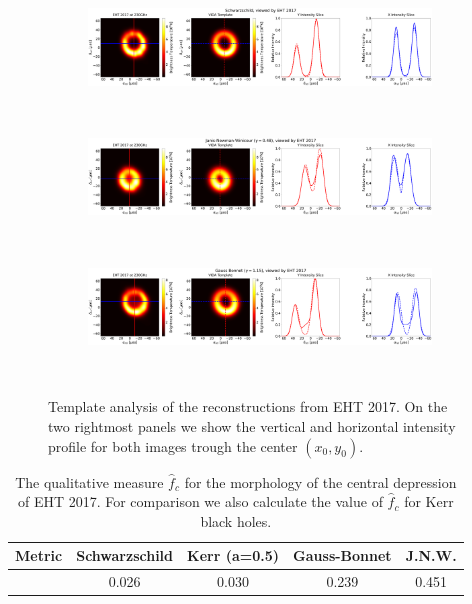 \documentclass[12pt]{article}
\numberwithin{equation}{section}
\numberwithin{figure}{section}
\begin{document}
	\begin{figure}[h!]
		\centering
		\begin{subfigure}{12cm}
			\hspace{-1.5cm}
			\includegraphics[scale = 0.13]{Section_8_Observing_Horizonless_Objects/Ehtim_Vida_plot_2017_230_Sch.png}
		\end{subfigure}\\
		\begin{subfigure}{12cm}
			\hspace{-1.5cm}
			\includegraphics[scale = 0.13]{Section_8_Observing_Horizonless_Objects/Ehtim_Vida_plot_2017_230_JNW.png}
		\end{subfigure}\\
		\begin{subfigure}{12cm}
			\hspace{-1.5cm}
			\includegraphics[scale = 0.13]{Section_8_Observing_Horizonless_Objects/Ehtim_Vida_plot_2017_230_GB.png}
		\end{subfigure}\\
		\label{VIDA_EHT_ng2017}
		\caption[Template analysis of the reconstructions from EHT 2017.]{\small Template analysis of the reconstructions from EHT 2017. On the two rightmost panels we show the vertical and horizontal intensity profile for both images trough the center $(x_0,y_0)$.} 
	\end{figure}
	
	\begin{table}[h!]
		\centering
		\begin{tabular}{||c|c|c|c|c||}
			\hline
			{Metric} & {Schwarzschild}&{Kerr (a=0.5)}&{Gauss-Bonnet}&{J.N.W.}
			\\\hline
			{\thead{$\hat{f}_c$}} & 0.026&0.030&0.239&0.451
			\\\hline
		\end{tabular}
		\caption[The qualitative measure $\hat{f}_c$ for the morphology of the central depression of EHT 2017.]{\small The qualitative measure $\hat{f}_c$ for the morphology of the central depression of EHT 2017. For comparison we also calculate the value of $\hat{f}_c$ for Kerr black holes.}
		\label{table:f_2017}
	\end{table}
	
\end{document}
